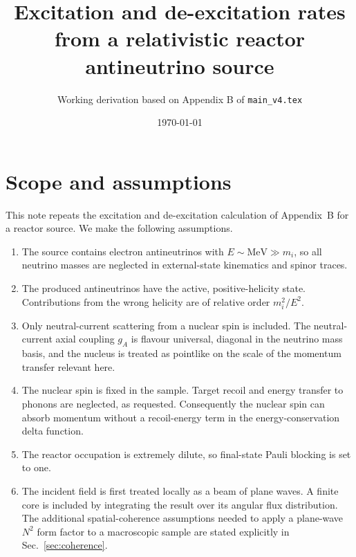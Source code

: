 \documentclass[aps,prd,10pt,onecolumn,nofootinbib,amsmath,amssymb]{revtex4-1}
\begin{document}
\title{Excitation and de-excitation rates from a relativistic reactor
antineutrino source}
\author{Working derivation based on Appendix B of \texttt{main\_v4.tex}}
\noaffiliation
\date{\today}
\maketitle

\section{Scope and assumptions}
\label{sec:scope}

This note repeats the excitation and de-excitation calculation of
Appendix~B for a reactor source.  We make the following assumptions.
\begin{enumerate}
  \item The source contains electron antineutrinos with
  \(E\sim\mathrm{MeV}\gg m_i\), so all neutrino masses are neglected in
  external-state kinematics and spinor traces.
  \item The produced antineutrinos have the active, positive-helicity state.
  Contributions from the wrong helicity are of relative order
  \(m_i^2/E^2\).
  \item Only neutral-current scattering from a nuclear spin is included.
  The neutral-current axial coupling \(g_A\) is flavour universal, diagonal
  in the neutrino mass basis, and the nucleus is treated as pointlike on the
  scale of the momentum transfer relevant here.
  \item The nuclear spin is fixed in the sample.  Target recoil and energy
  transfer to phonons are neglected, as requested.  Consequently the
  nuclear spin can absorb momentum without a recoil-energy term in the
  energy-conservation delta function.
  \item The reactor occupation is extremely dilute, so final-state Pauli
  blocking is set to one.
  \item The incident field is first treated locally as a beam of plane
  waves.  A finite core is included by integrating the result over its
  angular flux distribution.  The additional spatial-coherence assumptions
  needed to apply a plane-wave \(N^2\) form factor to a macroscopic sample
  are stated explicitly in Sec.~\ref{sec:coherence}.
\end{enumerate}
\end{document}
